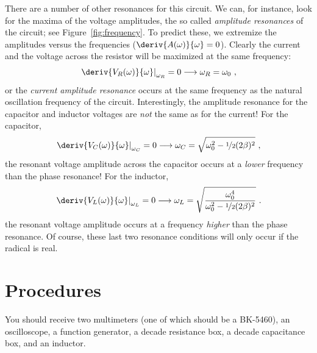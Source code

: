 \documentclass[12pt]{article}
\begin{document}
There are a number of other resonances for this circuit.  We can, for
instance, look for the maxima of the voltage amplitudes, the so called
\textit{amplitude resonances} of the circuit; see
Figure~\ref{fig:frequency}.  To predict these, we extremize the
amplitudes versus the frequencies ($\deriv{A(\omega)}{\omega} = 0$).
Clearly the current and the voltage across the resistor will be
maximized at the same frequency:
\begin{gather*}
  \left.\deriv{V_R(\omega)}{\omega}\right|_{\omega_R} = 0
  \longrightarrow \omega_R = \omega_0\ ,
\end{gather*}
or the \textit{current amplitude resonance} occurs at the same
frequency as the natural oscillation frequency of the circuit.
Interestingly, the amplitude resonance for the capacitor and inductor
voltages are \textit{not} the same as for the current!  For the
capacitor,
\begin{gather*}
  \left.\deriv{V_C(\omega)}{\omega}\right|_{\omega_C} = 0 
  \longrightarrow \omega_C = \sqrt{\omega_0^2 -
      \nicefrac{1}{2}(2\beta)^2}\ ,
\end{gather*}
the resonant voltage amplitude across the capacitor occurs at a
\textit{lower} frequency than the phase resonance!  For the inductor,
\begin{gather*}
  \left.\deriv{V_L(\omega)}{\omega}\right|_{\omega_L} = 0 
  \longrightarrow \omega_L = \sqrt{
      \frac{\omega_0^4}{\omega_0^2 - \nicefrac{1}{2}(2\beta)^2}
    }\ .
\end{gather*}
the resonant voltage amplitude occurs at a frequency \textit{higher}
than the phase resonance.  Of course, these last two resonance
conditions will only occur if the radical is real.

\section{Procedures}
\label{sec:procedures}

You should receive two multimeters (one of which should be a
BK-5460), an oscilloscope, a function generator, a
decade resistance box, a decade capacitance box, and an inductor.
\end{document}
